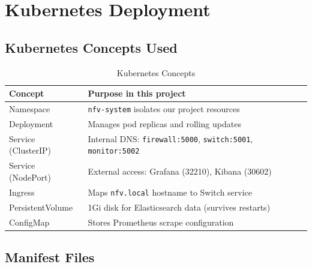 \documentclass[12pt,a4paper]{article}
\begin{document}
\section{Kubernetes Deployment}

\subsection{Kubernetes Concepts Used}

\begin{table}[h]
\centering
\begin{tabular}{@{}lp{9cm}@{}}
\toprule
\textbf{Concept} & \textbf{Purpose in this project} \\
\midrule
Namespace & \texttt{nfv-system} isolates our project resources \\
Deployment & Manages pod replicas and rolling updates \\
Service (ClusterIP) & Internal DNS: \texttt{firewall:5000}, \texttt{switch:5001}, \texttt{monitor:5002} \\
Service (NodePort) & External access: Grafana (32210), Kibana (30602) \\
Ingress & Maps \texttt{nfv.local} hostname to Switch service \\
PersistentVolume & 1Gi disk for Elasticsearch data (survives restarts) \\
ConfigMap & Stores Prometheus scrape configuration \\
\bottomrule
\end{tabular}
\caption{Kubernetes Concepts}
\end{table}

\subsection{Manifest Files}
\end{document}
